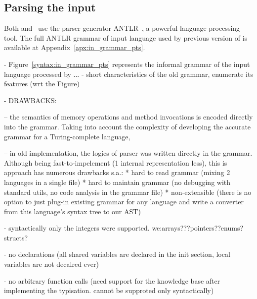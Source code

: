 \subsection{Parsing the input}
\label{ch:impl:input-parser}


Both \porthos{} and \porthos[2] \ use the parser generator ANTLR~\cite{parr2013definitive}, a powerful language processing tool.
The full ANTLR grammar of input language used by previous version of \porthos{} is available at Appendix~\ref{apx:in_grammar_pts}.


- Figure~\ref{syntax:in_grammar_pts} represents the informal grammar of the input language processed by \porthos[1] ... %
- short characteristics of the old grammar, enumerate its features (wrt the Figure)

- DRAWBACKS: %

    -- the semantics of memory operations and method invocations is encoded directly into the grammar.
    Taking into account the complexity of developing the accurate grammar for a Turing-complete language,

    -- in old implementation, the logics of parser was written directly in the grammar.
    Although being fast-to-impelement (1 internal representation less), this is approach has numerous drawbacks s.a.:
    * hard to read grammar (mixing 2 languages in a single file)
    * hard to maintain grammar (no debugging with standard utils, no code analysis in the grammar file)
    * non-extensible (there is no option to just plug-in existing grammar for any language and write a converter from this language's syntax tree to our AST)

    - syntactically only the integers were supported. we:arrays???pointers??enums?structs?

    - no declarations (all shared variables are declared in the init section, local variables are not decalred ever)

    - no arbitrary function calls (need support for the knowledge base after implementing the typisation. cannot be supproted only syntactically)


